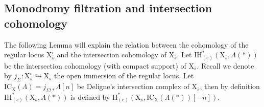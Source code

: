 \documentclass[10pt]{amsart}
\numberwithin{equation}{section}
\theoremstyle{definition}
\def\rmc{\mathrm{c}}
\def\rmX{\mathrm{X}}
\begin{document}
\subsection{Monodromy filtration and intersection cohomology}
The following Lemma will explain the relation between the cohomology of the regular locus $\rmX^{\square}_{\overline{s}}$ and the intersection cohomology of $\rmX_{\overline{s}}$. Let $\mathrm{IH}^{\ast}_{(\rmc)}(\rmX_{\overline{s}}, \Lambda(\ast))$ be the intersection cohomology (with compact support) of $\rmX_{\overline{s}}$. Recall we denote by $j_{\Sigma}: \rmX^{\square}_{\overline{s}}\hookrightarrow \rmX_{\overline{s}}$ the open immersion of the regular locus. Let $\mathrm{IC}_{\rmX}(\Lambda)=j_{\Sigma!\ast}\Lambda[n]$ be Deligne's intersection complex of $\rmX_{\overline{s}}$, then by definition $\mathrm{IH}^{\ast}_{(\rmc)}(\rmX_{\overline{s}}, \Lambda(\ast))$ is defined by $\mathrm{H}^{\ast}_{(\rmc)}(\rmX_{\overline{s}}, \mathrm{IC}_{\rmX}(\Lambda(\ast))[-n])$.
\end{document}
